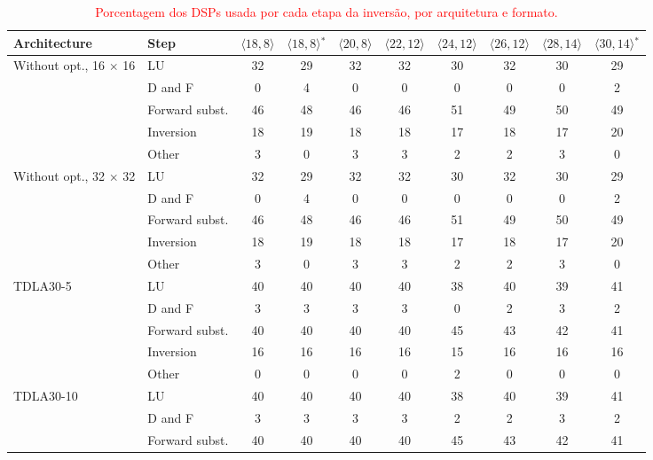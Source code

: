 \begin{table}[htbp]
\caption{\textcolor{red}{Porcentagem dos DSPs usada por cada etapa da inversão, por arquitetura e formato.}}
\label{tab:etapas-dsp}
\vspace{4pt} %
\centering
\scriptsize
\color{red}
\renewcommand{\arraystretch}{1.05}
\setlength{\tabcolsep}{3pt}
\begin{tabular}{llcccccccc}
\toprule
\textbf{Architecture} & \textbf{Step} & \textbf{$\langle 18,8\rangle$} & \textbf{$\langle 18,8\rangle$$^{*}$} & \textbf{$\langle 20,8\rangle$} & \textbf{$\langle 22,12\rangle$} & \textbf{$\langle 24,12\rangle$} & \textbf{$\langle 26,12\rangle$} & \textbf{$\langle 28,14\rangle$} & \textbf{$\langle 30,14\rangle$$^{*}$} \\
\midrule
\multirow{5}{*}{Without opt., 16 $\times$ 16} & LU & 32 & 29 & 32 & 32 & 30 & 32 & 30 & 29 \\
 & D and F & 0 & 4 & 0 & 0 & 0 & 0 & 0 & 2 \\
 & Forward subst. & 46 & 48 & 46 & 46 & 51 & 49 & 50 & 49 \\
 & Inversion & 18 & 19 & 18 & 18 & 17 & 18 & 17 & 20 \\
 & Other & 3 & 0 & 3 & 3 & 2 & 2 & 3 & 0 \\
\midrule
\multirow{5}{*}{Without opt., 32 $\times$ 32} & LU & 32 & 29 & 32 & 32 & 30 & 32 & 30 & 29 \\
 & D and F & 0 & 4 & 0 & 0 & 0 & 0 & 0 & 2 \\
 & Forward subst. & 46 & 48 & 46 & 46 & 51 & 49 & 50 & 49 \\
 & Inversion & 18 & 19 & 18 & 18 & 17 & 18 & 17 & 20 \\
 & Other & 3 & 0 & 3 & 3 & 2 & 2 & 3 & 0 \\
\midrule
\multirow{5}{*}{TDLA30-5} & LU & 40 & 40 & 40 & 40 & 38 & 40 & 39 & 41 \\
 & D and F & 3 & 3 & 3 & 3 & 0 & 2 & 3 & 2 \\
 & Forward subst. & 40 & 40 & 40 & 40 & 45 & 43 & 42 & 41 \\
 & Inversion & 16 & 16 & 16 & 16 & 15 & 16 & 16 & 16 \\
 & Other & 0 & 0 & 0 & 0 & 2 & 0 & 0 & 0 \\
\midrule
\multirow{5}{*}{TDLA30-10} & LU & 40 & 40 & 40 & 40 & 38 & 40 & 39 & 41 \\
 & D and F & 3 & 3 & 3 & 3 & 2 & 2 & 3 & 2 \\
 & Forward subst. & 40 & 40 & 40 & 40 & 45 & 43 & 42 & 41 \\

\end{tabular}
\end{table}
